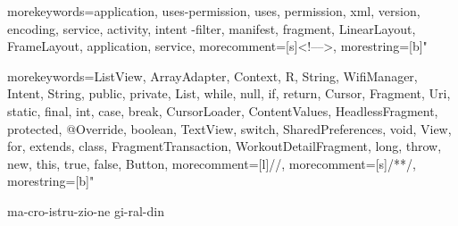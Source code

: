 {
	morekeywords={application, uses-permission, uses, permission, xml, version, encoding, service, activity, intent -filter, manifest, fragment, LinearLayout, FrameLayout,
	application, service},
	morecomment=[s]{<!--}{-->}, %
	morestring=[b]" %
}

{
	morekeywords={ListView, ArrayAdapter, Context, R, String, WifiManager, Intent,
		String, public, private, List, while, null, if, return, Cursor, Fragment, Uri,
		static, final, int, case, break, CursorLoader, ContentValues, HeadlessFragment,
		protected, @Override, boolean, TextView, switch, SharedPreferences, void,
		View, for, extends, class, FragmentTransaction, WorkoutDetailFragment, long,
		throw, new, this, true, false, Button},
	morecomment=[l]{//},
	morecomment=[s]{/*}{*/},
	morestring=[b]"
}





\newcommand{\omissis}{[\dots\negthinspace]} %

\hyphenation
{
    ma-cro-istru-zio-ne
    gi-ral-din
}

\newcommand{\sectionname}{sezione}

\newcommand{\glsfirstoccur}{\ap{{[g]}}}

\newcommand{\intro}[1]{\emph{\textsf{#1}}}
